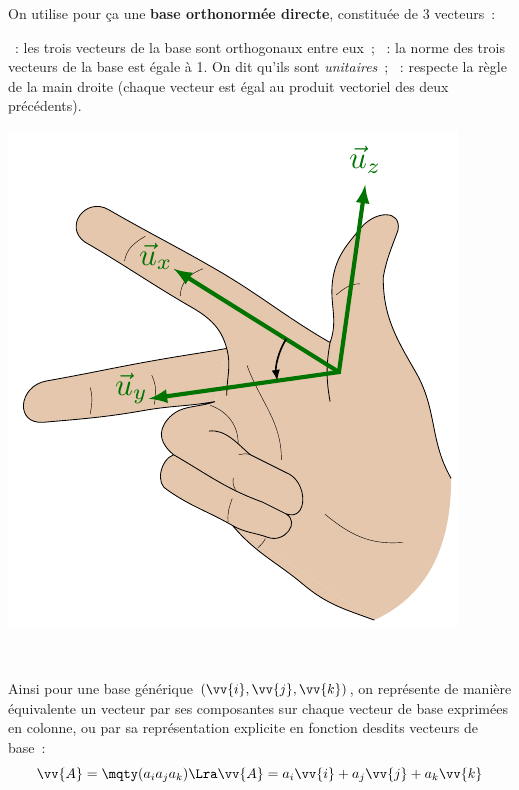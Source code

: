 \documentclass[../../main/main.tex]{subfiles}
\begin{document}
On utilise pour ça une \textbf{base orthonormée directe}, constituée de 3
vecteurs~:

\noindent
\begin{minipage}{0.70\linewidth}
	\begin{itemize}
		~: les trois vecteurs de la base sont orthogonaux
		entre eux~;
		~: la norme des trois vecteurs de la base est égale
		à 1. On dit qu'ils sont \textit{unitaires}~;
		~: respecte la règle de la main droite (chaque
		vecteur est égal au produit vectoriel des deux précédents).
	\end{itemize}
\end{minipage}
\hfill
\begin{minipage}{0.20\linewidth}
	\begin{center}
		\includegraphics[width=\linewidth]{righthand}
	\end{center}
\end{minipage}
\hfill~

Ainsi pour une base générique $\left(\vv{i}, \vv{j}, \vv{k}\right)$, on
représente de manière équivalente un vecteur par ses composantes sur chaque
vecteur de base exprimées en colonne, ou par sa représentation explicite en
fonction desdits vecteurs de base~:
\[
	\vv{A} = \mqty(a_i\\a_j\\a_k)
	\Lra
	\vv{A} = a_i \vv{i} + a_j \vv{j} + a_k \vv{k}
\]
\end{document}
